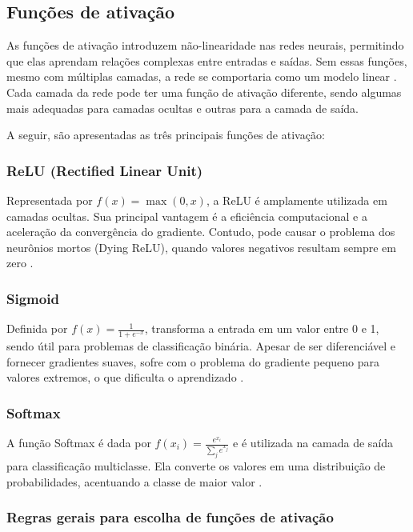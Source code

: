 \subsection{Funções de ativação}

As funções de ativação introduzem não-linearidade nas redes neurais, permitindo que elas aprendam relações complexas entre entradas e saídas. Sem essas funções, mesmo com múltiplas camadas, a rede se comportaria como um modelo linear \cite{badiger2022retrospective}. Cada camada da rede pode ter uma função de ativação diferente, sendo algumas mais adequadas para camadas ocultas e outras para a camada de saída.

A seguir, são apresentadas as três principais funções de ativação:

\subsubsection{ReLU (Rectified Linear Unit)}
Representada por $f(x) = \max(0, x)$, a ReLU é amplamente utilizada em camadas ocultas. Sua principal vantagem é a eficiência computacional e a aceleração da convergência do gradiente. Contudo, pode causar o problema dos neurônios mortos (Dying ReLU), quando valores negativos resultam sempre em zero \cite{agarap2018deep}.

\subsubsection{Sigmoid}
Definida por $f(x) = \frac{1}{1 + e^{-x}}$, transforma a entrada em um valor entre 0 e 1, sendo útil para problemas de classificação binária. Apesar de ser diferenciável e fornecer gradientes suaves, sofre com o problema do gradiente pequeno para valores extremos, o que dificulta o aprendizado \cite{langer2020approximating}.

\subsubsection{Softmax}
A função Softmax é dada por $f(x_i) = \frac{e^{x_i}}{\sum_j e^{x_j}}$ e é utilizada na camada de saída para classificação multiclasse. Ela converte os valores em uma distribuição de probabilidades, acentuando a classe de maior valor \cite{gao2017properties}.

\subsubsection{Regras gerais para escolha de funções de ativação}

